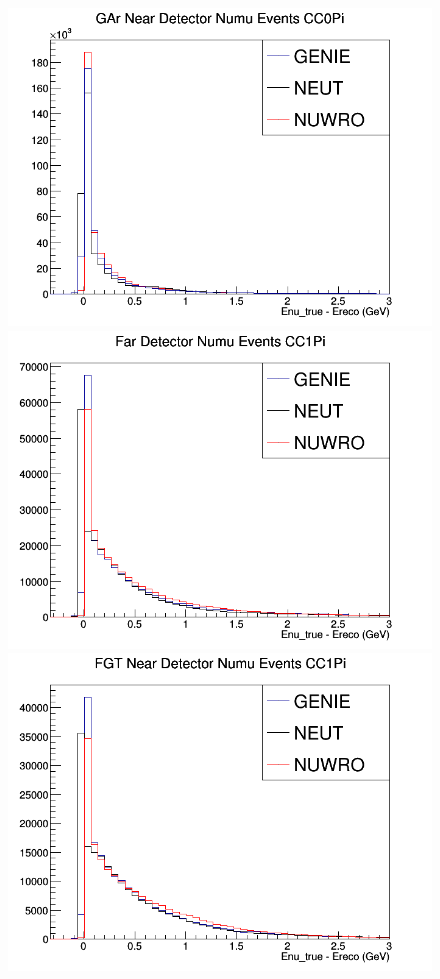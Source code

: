\begin{figure}[h]
\endminipage
{}
\includegraphics[width=\linewidth]{Ereco_Etrue/numu_GAr_CC0Pi.png}
\endminipage
\newline
{}
\includegraphics[width=\linewidth]{Ereco_Etrue/numu_FD_CC1Pi.png}
\endminipage
{}
\includegraphics[width=\linewidth]{Ereco_Etrue/numu_FGT_CC1Pi.png}

\end{figure}
